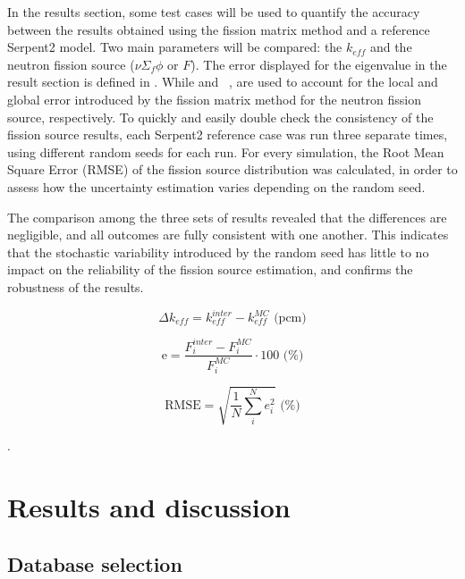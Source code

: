 \documentclass[preprint,review,12pt]{elsarticle}
\begin{document}
In the results section, some test cases will be used to quantify the accuracy between the results obtained using the fission matrix method and a reference Serpent2 model. Two main parameters will be compared: the $k_{eff}$ and the neutron fission source ($\nu\Sigma_f\phi$ or $F$). The error displayed for the eigenvalue in the result section is defined in . While  and \ , are used to account for the local and global error introduced by the fission matrix method for the neutron fission source, respectively. To quickly and easily double check the consistency of the fission source results, each Serpent2 reference case was run three separate times, using different random seeds for each run. For every simulation, the Root Mean Square Error (RMSE) of the fission source distribution was calculated, in order to assess how the uncertainty estimation varies depending on the random seed.

The comparison among the three sets of results revealed that the differences are negligible, and all outcomes are fully consistent with one another. This indicates that the stochastic variability introduced by the random seed has little to no impact on the reliability of the fission source estimation, and confirms the robustness of the results.   

\begin{equation}
    \Delta k_{eff} = k^{inter}_{eff} - k^{MC}_{eff}  \text{ (pcm)}
\label{eq:keff_err}
\end{equation}


\begin{equation}
    \text{e} = \frac{F_i^{inter}-F_i^{MC}}{F_i^{MC}} \cdot 100 \text{ (\%)}
\label{eq:fission_source_rel_err}
\end{equation}


\begin{equation}
    \text{RMSE}  = \sqrt{\frac{1}{N} \sum_i^N e_i^2 } \text{ (\%)}
\label{eq:fission_source_RMS_err}
\end{equation}



.
\section{Results and discussion}

\subsection{Database selection}
\end{document}
